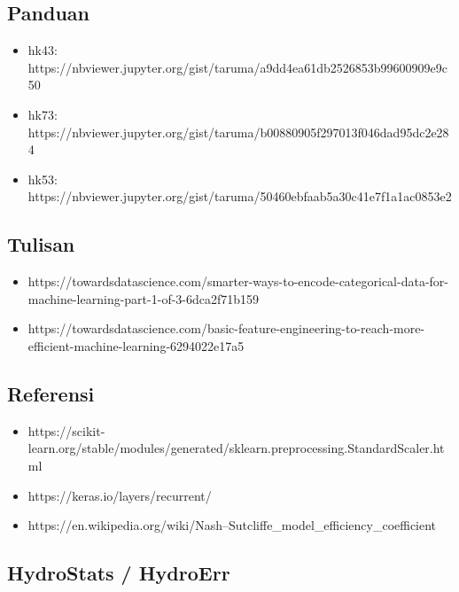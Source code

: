 \documentclass[11pt]{article}
\providecommand{\tightlist}{%
      \setlength{\itemsep}{0pt}\setlength{\parskip}{0pt}}
\begin{document}
\hypertarget{panduan}{%
\subsection{Panduan}\label{panduan}}

\begin{itemize}
\tightlist
\item
  hk43:
  https://nbviewer.jupyter.org/gist/taruma/a9dd4ea61db2526853b99600909e9c50
\item
  hk73:
  https://nbviewer.jupyter.org/gist/taruma/b00880905f297013f046dad95dc2e284
\item
  hk53:
  https://nbviewer.jupyter.org/gist/taruma/50460ebfaab5a30c41e7f1a1ac0853e2
\end{itemize}

\hypertarget{tulisan}{%
\subsection{Tulisan}\label{tulisan}}

\begin{itemize}
\tightlist
\item
  https://towardsdatascience.com/smarter-ways-to-encode-categorical-data-for-machine-learning-part-1-of-3-6dca2f71b159
\item
  https://towardsdatascience.com/basic-feature-engineering-to-reach-more-efficient-machine-learning-6294022e17a5
\end{itemize}

\hypertarget{referensi}{%
\subsection{Referensi}\label{referensi}}

\begin{itemize}
\tightlist
\item
  https://scikit-learn.org/stable/modules/generated/sklearn.preprocessing.StandardScaler.html
\item
  https://keras.io/layers/recurrent/
\item
  https://en.wikipedia.org/wiki/Nash--Sutcliffe\_model\_efficiency\_coefficient
\end{itemize}

\hypertarget{hydrostats-hydroerr}{%
\subsection{HydroStats / HydroErr}\label{hydrostats-hydroerr}}
\end{document}
